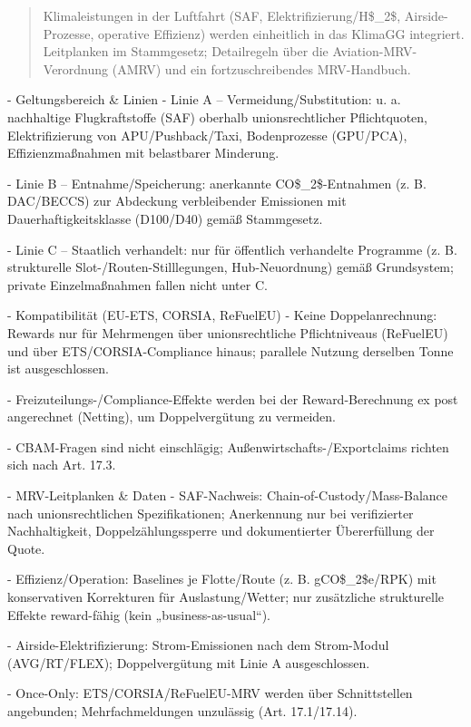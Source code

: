 \documentclass[12pt,a4paper]{scrartcl}
\begin{document}
\begin{quote}
Klimaleistungen in der Luftfahrt (SAF, Elektrifizierung/H\$\_2\$, Airside-Prozesse, operative Effizienz) werden einheitlich in das KlimaGG integriert. Leitplanken im Stammgesetz; Detailregeln über die Aviation-MRV-Verordnung (AMRV) und ein fortzuschreibendes MRV-Handbuch.
\end{quote}

- Geltungsbereich \& Linien
- Linie A -- Vermeidung/Substitution: u. a. nachhaltige Flugkraftstoffe (SAF) oberhalb unionsrechtlicher Pflichtquoten, Elektrifizierung von APU/Pushback/Taxi, Bodenprozesse (GPU/PCA), Effizienzmaßnahmen mit belastbarer Minderung.

- Linie B -- Entnahme/Speicherung: anerkannte CO\$\_2\$-Entnahmen (z. B. DAC/BECCS) zur Abdeckung verbleibender Emissionen mit Dauerhaftigkeitsklasse (D100/D40) gemäß Stammgesetz.

- Linie C -- Staatlich verhandelt: nur für öffentlich verhandelte Programme (z. B. strukturelle Slot-/Routen-Stilllegungen, Hub-Neuordnung) gemäß Grundsystem; private Einzelmaßnahmen fallen nicht unter C.

- Kompatibilität (EU-ETS, CORSIA, ReFuelEU)
- Keine Doppelanrechnung: Rewards nur für Mehrmengen über unionsrechtliche Pflichtniveaus (ReFuelEU) und über ETS/CORSIA-Compliance hinaus; parallele Nutzung derselben Tonne ist ausgeschlossen.

- Freizuteilungs-/Compliance-Effekte werden bei der Reward-Berechnung ex post angerechnet (Netting), um Doppelvergütung zu vermeiden.

- CBAM-Fragen sind nicht einschlägig; Außenwirtschafts-/Exportclaims richten sich nach Art. 17.3.

- MRV-Leitplanken \& Daten
- SAF-Nachweis: Chain-of-Custody/Mass-Balance nach unionsrechtlichen Spezifikationen; Anerkennung nur bei verifizierter Nachhaltigkeit, Doppelzählungssperre und dokumentierter Übererfüllung der Quote.

- Effizienz/Operation: Baselines je Flotte/Route (z. B. gCO\$\_2\$e/RPK) mit konservativen Korrekturen für Auslastung/Wetter; nur zusätzliche strukturelle Effekte reward-fähig (kein „business-as-usual“).

- Airside-Elektrifizierung: Strom-Emissionen nach dem Strom-Modul (AVG/RT/FLEX); Doppelvergütung mit Linie A ausgeschlossen.

- Once-Only: ETS/CORSIA/ReFuelEU-MRV werden über Schnittstellen angebunden; Mehrfachmeldungen unzulässig (Art. 17.1/17.14).
\end{document}
